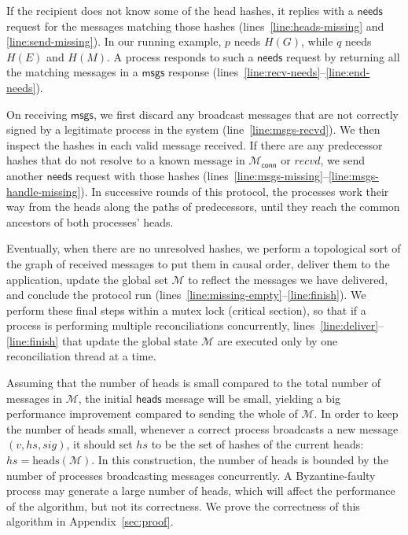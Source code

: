 \documentclass[a4paper,anonymous,USenglish]{lipics-v2019}
\begin{document}
If the recipient does not know some of the head hashes, it replies with a $\mathsf{needs}$ request for the messages matching those hashes (lines~\ref{line:heads-missing} and \ref{line:send-missing}).
In our running example, $p$ needs $H(G)$, while $q$ needs $H(E)$ and $H(M)$.
A process responds to such a $\mathsf{needs}$ request by returning all the matching messages in a $\mathsf{msgs}$ response (lines~\ref{line:recv-needs}--\ref{line:end-needs}).

On receiving $\mathsf{msgs}$, we first discard any broadcast messages that are not correctly signed by a legitimate process in the system (line~\ref{line:msgs-recvd}).
We then inspect the hashes in each valid message received.
If there are any predecessor hashes that do not resolve to a known message in $\mathcal{M}_\mathsf{conn}$ or $\mathit{recvd}$, we send another $\mathsf{needs}$ request with those hashes (lines~\ref{line:msgs-missing}--\ref{line:msgs-handle-missing}).
In successive rounds of this protocol, the processes work their way from the heads along the paths of predecessors, until they reach the common ancestors of both processes' heads.

Eventually, when there are no unresolved hashes, we perform a topological sort of the graph of received messages to put them in causal order, deliver them to the application, update the global set $\mathcal{M}$ to reflect the messages we have delivered, and conclude the protocol run (lines~\ref{line:missing-empty}--\ref{line:finish}).
We perform these final steps within a mutex lock (critical section), so that if a process is performing multiple reconciliations concurrently, lines~\ref{line:deliver}--\ref{line:finish} that update the global state $\mathcal{M}$ are executed only by one reconciliation thread at a time.

Assuming that the number of heads is small compared to the total number of messages in $\mathcal{M}$, the initial $\mathsf{heads}$ message will be small, yielding a big performance improvement compared to sending the whole of $\mathcal{M}$.
In order to keep the number of heads small, whenever a correct process broadcasts a new message $(v, \mathit{hs}, \mathit{sig})$, it should set $\mathit{hs}$ to be the set of hashes of the current heads:
$\mathit{hs} = \mathrm{heads}(\mathcal{M})$.
In this construction, the number of heads is bounded by the number of processes broadcasting messages concurrently.
A Byzantine-faulty process may generate a large number of heads, which will affect the performance of the algorithm, but not its correctness.
We prove the correctness of this algorithm in Appendix~\ref{sec:proof}.
\end{document}
